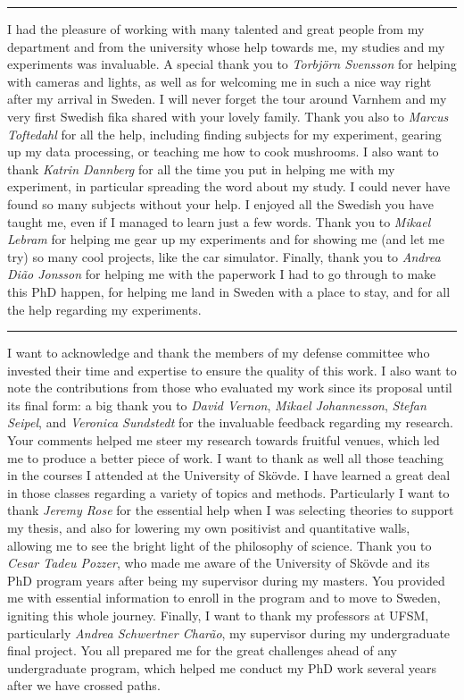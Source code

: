 \vspace{7pt}\hrule\vspace{5pt}

I had the pleasure of working with many talented and great people from my department and from the university whose help towards me, my studies and my experiments was invaluable. A special thank you to \textit{Torbj{\"o}rn Svensson} for helping with cameras and lights, as well as for welcoming me in such a nice way right after my arrival in Sweden. I will never forget the tour around Varnhem and my very first Swedish fika shared with your lovely family. Thank you also to \textit{Marcus Toftedahl} for all the help, including finding subjects for my experiment, gearing up my data processing, or teaching me how to cook mushrooms. I also want to thank \textit{Katrin Dannberg} for all the time you put in helping me with my experiment, in particular spreading the word about my study. I could never have found so many subjects without your help. I enjoyed all the Swedish you have taught me, even if I managed to learn just a few words. Thank you to \textit{Mikael Lebram} for helping me gear up my experiments and for showing me (and let me try) so many cool projects, like the car simulator. Finally, thank you to \textit{Andrea Di{\~a}o Jonsson} for helping me with the paperwork I had to go through to make this PhD happen, for helping me land in Sweden with a place to stay, and for all the help regarding my experiments.

\vspace{7pt}\hrule\vspace{5pt}

I want to acknowledge and thank the members of my defense committee who invested their time and expertise to ensure the quality of this work. I also want to note the contributions from those who evaluated my work since its proposal until its final form: a big thank you to \textit{David Vernon}, \textit{Mikael Johannesson}, \textit{Stefan Seipel}, and \textit{Veronica Sundstedt} for the invaluable feedback regarding my research. Your comments helped me steer my research towards fruitful venues, which led me to produce a better piece of work. I want to thank as well all those teaching in the courses I attended at the University of Sk{\"o}vde. I have learned a great deal in those classes regarding a variety of topics and methods. Particularly I want to thank \textit{Jeremy Rose} for the essential help when I was selecting theories to support my thesis, and also for lowering my own positivist and quantitative walls, allowing me to see the bright light of the philosophy of science. Thank you to \textit{Cesar Tadeu Pozzer}, who made me aware of the University of Sk{\"o}vde and its PhD program years after being my supervisor during my masters. You provided me with essential information to enroll in the program and to move to Sweden, igniting this whole journey. Finally, I want to thank my professors at UFSM, particularly \textit{Andrea Schwertner Char{\~a}o}, my supervisor during my undergraduate final project. You all prepared me for the great challenges ahead of any undergraduate program, which helped me conduct my PhD work several years after we have crossed paths.

